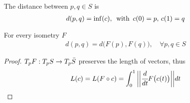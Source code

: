\documentclass[10pt]{article}
\begin{document}
            \begin{definition}
                The distance between $p, q\in S$ is 
                \begin{equation*}
                    \begin{aligned}
                        d(p, q) = \inf(c), \thinspace\thinspace\thinspace\text{with}\thinspace\thinspace\thinspace c(0) = p,\thinspace c(1) = q
                    \end{aligned}
                \end{equation*}
            \end{definition}
            \begin{proposition}
                For every isometry $F$
                \begin{equation*}
                    \begin{aligned}
                        d(p,q) = d\big(F(p), F(q)\big),\quad \forall p, q \in S
                    \end{aligned}
                \end{equation*}
            \end{proposition}
            \begin{proof}
                $T_pF: T_pS\rightarrow T_p\Bar{S}$ preserves the length of vectors, thus
                \begin{equation*}
                    \begin{aligned}
                        L(c) = L(F\circ c) = \int_0^1\bigg|\bigg|\cfrac{d}{dt}F\big(c(t)\big)\bigg|\bigg|dt
                    \end{aligned}
                \end{equation*}
            \end{proof}
\end{document}
